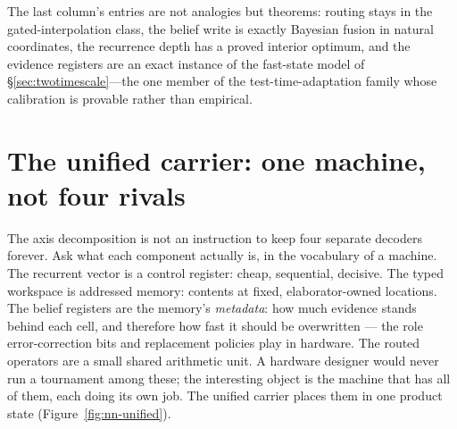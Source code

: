 \documentclass[11pt]{article}
\begin{document}
The last column's entries are not analogies but theorems: routing stays in the
gated-interpolation class, the belief write is exactly Bayesian fusion in natural
coordinates, the recurrence depth has a proved interior optimum, and the evidence
registers are an exact instance of the fast-state model of
\S\ref{sec:twotimescale}---the one member of the test-time-adaptation family whose
calibration is provable rather than empirical.

\section{The unified carrier: one machine, not four rivals}
\label{sec:unified}

The axis decomposition is not an instruction to keep four separate decoders forever.
Ask what each component actually is, in the vocabulary of a machine. The recurrent
vector is a control register: cheap, sequential, decisive. The typed workspace is
addressed memory: contents at fixed, elaborator-owned locations. The belief registers
are the memory's \emph{metadata}: how much evidence stands behind each cell, and
therefore how fast it should be overwritten --- the role error-correction bits and
replacement policies play in hardware. The routed operators are a small shared
arithmetic unit. A hardware designer would never run a tournament among these; the
interesting object is the machine that has all of them, each doing its own job. The
unified carrier places them in one product state (Figure~\ref{fig:nn-unified}).
\end{document}
